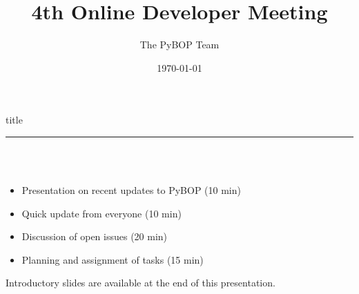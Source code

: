 \documentclass[aspectratio=169]{beamer}
\title{4th Online Developer Meeting}
\author{The PyBOP Team \texorpdfstring{\hypersetup{urlcolor=white}\href{https://github.com/pybop-team/PyBOP}{\faGithub}}{}}
\institute{}
\date{\today}
\begin{document}
{ 
%
\frame{\titlepage}}


\begin{frame}[plain]
    \centering
    \begin{beamercolorbox}[sep=8pt,center,shadow=true,rounded=true]{title}
    \par%
    \color{oxfordblue}\noindent\rule{10cm}{1pt} \\
    \LARGE{\faFileTextO} \\
    \vspace{6mm} \normalsize
    \begin{itemize}
        \item Presentation on recent updates to PyBOP (10 min)
        \item Quick update from everyone (10 min)
        \item Discussion of open issues (20 min)
        \item Planning and assignment of tasks (15 min)
    \end{itemize}
    \end{beamercolorbox}
    Introductory slides are available at the end of this presentation.
\end{frame}
\end{document}
